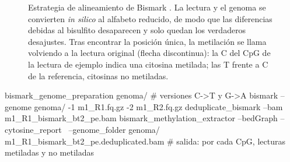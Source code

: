 \begin{figure}[t]
\centering
{}
\caption[Estrategia de alineamiento de Bismark]{Estrategia de alineamiento de Bismark \parencite{c13-krueger2011}. La lectura y el genoma se convierten \emph{in silico} al alfabeto reducido, de modo que las diferencias debidas al bisulfito desaparecen y solo quedan los verdaderos desajustes. Tras encontrar la posición única, la metilación se llama volviendo a la lectura original (flecha discontinua): la C del CpG de la lectura de ejemplo indica una citosina metilada; las T frente a C de la referencia, citosinas no metiladas.}
\label{fig:13-bismark}
\end{figure}

\begin{consola}
bismark_genome_preparation genoma/            # versiones C->T y G->A
bismark --genome genoma/ -1 m1_R1.fq.gz -2 m1_R2.fq.gz
deduplicate_bismark --bam m1_R1_bismark_bt2_pe.bam
bismark_methylation_extractor --bedGraph --cytosine_report \
    --genome_folder genoma/ m1_R1_bismark_bt2_pe.deduplicated.bam
# salida: por cada CpG, lecturas metiladas y no metiladas
\end{consola}


